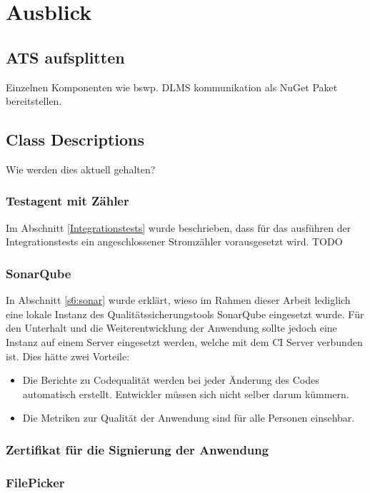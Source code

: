 
\chapter{Ausblick}

\section{ATS aufsplitten}\label{ausblick:ats_split}
Einzelnen Komponenten wie bswp. DLMS kommunikation als NuGet Paket bereitstellen.


\section{Class Descriptions}
Wie werden dies aktuell gehalten?


\subsection{Testagent mit Zähler}
Im Abschnitt \ref{Integrationstests} wurde beschrieben, dass für das ausführen der Integrationstests ein angeschlossener Stromzähler vorausgesetzt wird.
TODO

\subsection{SonarQube}
In Abschnitt \ref{s6:sonar} wurde erklärt, wieso im Rahmen dieser Arbeit lediglich eine lokale Instanz des Qualitätssicherungstools SonarQube eingesetzt wurde.
Für den Unterhalt und die Weiterentwicklung der Anwendung sollte jedoch eine Instanz auf einem Server eingesetzt werden, welche mit dem \ac{CI} Server verbunden ist.
Dies hätte zwei Vorteile:
\begin{itemize}
   \item Die Berichte zu Codequalität werden bei jeder Änderung des Codes automatisch erstellt. 
Entwickler müssen sich nicht selber darum kümmern.
   \item Die Metriken zur Qualität der Anwendung sind für alle Personen einsehbar.
\end{itemize}

\subsection{Zertifikat für die Signierung der Anwendung}\label{ausblick:cert}

\subsection{FilePicker}\label{ausblick:filePicker}
